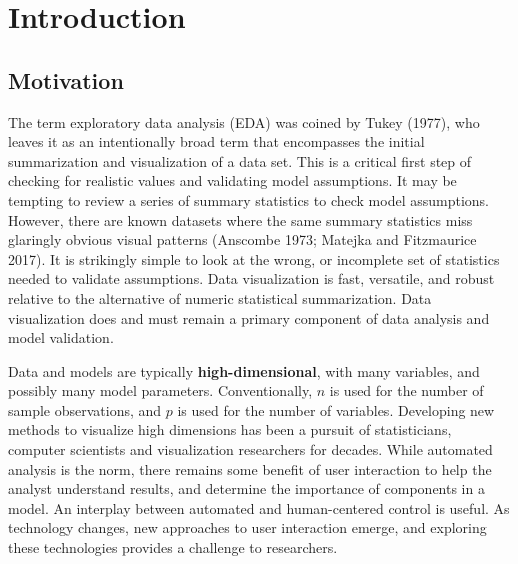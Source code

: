 \documentclass[11,]{article}
\begin{document}
\newpage

% 

\doublespacing

\newpage
{}
\hypersetup{linkcolor = blue}

{
\hypersetup{linkcolor=black}
\setcounter{tocdepth}{2}
\tableofcontents
}
\hypertarget{sec:intro}{%
\section{Introduction}\label{sec:intro}}

\hypertarget{motivation}{%
\subsection{Motivation}\label{motivation}}

The term exploratory data analysis (EDA) was coined by Tukey (1977), who leaves it as an intentionally broad term that encompasses the initial summarization and visualization of a data set. This is a critical first step of checking for realistic values and validating model assumptions. It may be tempting to review a series of summary statistics to check model assumptions. However, there are known datasets where the same summary statistics miss glaringly obvious visual patterns (Anscombe 1973; Matejka and Fitzmaurice 2017). It is strikingly simple to look at the wrong, or incomplete set of statistics needed to validate assumptions. Data visualization is fast, versatile, and robust relative to the alternative of numeric statistical summarization. Data visualization does and must remain a primary component of data analysis and model validation.

Data and models are typically \textbf{high-dimensional}, with many variables, and possibly many model parameters. Conventionally, \(n\) is used for the number of sample observations, and \(p\) is used for the number of variables. Developing new methods to visualize high dimensions has been a pursuit of statisticians, computer scientists and visualization researchers for decades. While automated analysis is the norm, there remains some benefit of user interaction to help the analyst understand results, and determine the importance of components in a model. An interplay between automated and human-centered control is useful. As technology changes, new approaches to user interaction emerge, and exploring these technologies provides a challenge to researchers.
\end{document}
